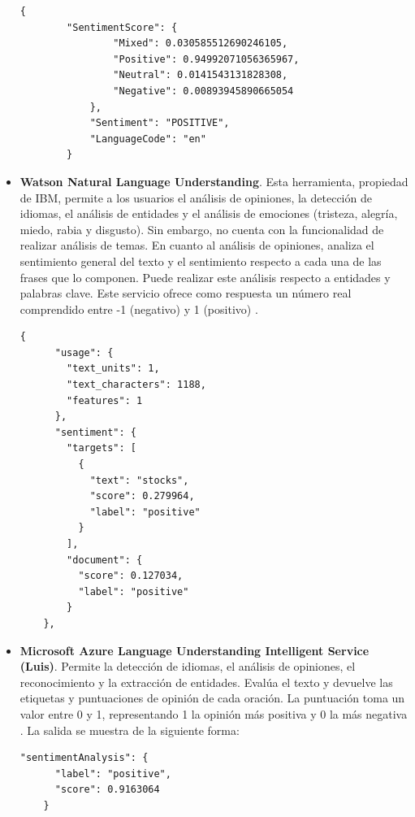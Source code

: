 \begin{itemize}
    \begin{lstlisting}[caption=Salida al analizar el sentimiento de un texto con Amazon Comprehend ]
        {
        "SentimentScore": {
                "Mixed": 0.030585512690246105,
                "Positive": 0.94992071056365967,
                "Neutral": 0.0141543131828308,
                "Negative": 0.00893945890665054
            },
            "Sentiment": "POSITIVE",
            "LanguageCode": "en"
        }
    \end{lstlisting}
    \item \textbf{Watson Natural Language Understanding}. Esta herramienta, propiedad de IBM, permite a los usuarios el análisis de opiniones, la detección de idiomas, el análisis de entidades y el análisis de emociones (tristeza, alegría, miedo, rabia y  disgusto). Sin embargo, no cuenta con la funcionalidad de realizar análisis de temas. En cuanto al análisis de opiniones, analiza el sentimiento general del texto y el sentimiento respecto a cada una de las frases que lo componen. Puede realizar este análisis respecto a entidades y palabras clave. Este servicio ofrece como respuesta un número real comprendido entre -1 (negativo) y 1 (positivo) . 
    
     \begin{lstlisting}[caption=Salida al analizar el sentimiento de un texto con Watson ]
    {
      "usage": {
        "text_units": 1,
        "text_characters": 1188,
        "features": 1
      },
      "sentiment": {
        "targets": [
          {
            "text": "stocks",
            "score": 0.279964,
            "label": "positive"
          }
        ],
        "document": {
          "score": 0.127034,
          "label": "positive"
        }
    },
    \end{lstlisting}
    
    \item \textbf{Microsoft Azure Language Understanding Intelligent Service (Luis)}. Permite la detección de idiomas, el análisis de opiniones, el reconocimiento y la extracción de entidades.  Evalúa el texto y devuelve las etiquetas y puntuaciones de opinión de cada oración. La puntuación toma un valor entre 0 y 1, representando 1 la opinión más positiva y 0 la más negativa . La salida se muestra de la siguiente forma:
    \begin{lstlisting}[caption=Salida al analizar el sentimiento de un texto con Luis ]
    "sentimentAnalysis": {
      "label": "positive",
      "score": 0.9163064
    }
    \end{lstlisting}
\end{itemize}

